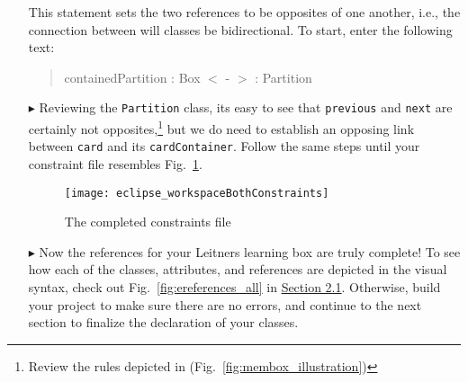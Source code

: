\begin{itemize}
This statement sets the two references to be opposites of one another, i.e., the connection between will classes be bidirectional. To start, enter the following
text:

{\begin{quote} \small
	containedPartition : Box $<$ - $>$ : Partition
\end{quote}}

\item[$\blacktriangleright$] Reviewing the \texttt{Partition} class, its easy to see that \texttt{previous} and \texttt{next} are certainly not
opposites,\footnote{Review the rules depicted in (Fig.~\ref{fig:membox_illustration})} but we do need to establish an opposing link between
\texttt{card} and its \texttt{cardContainer}. Follow the same steps until your constraint file resembles Fig.~\ref{fig:bothConstraints}.

\begin{figure}[htbp]
	\centering
  \texttt{[image: eclipse\_workspaceBothConstraints]}
	\caption{The completed constraints file}
	\label{fig:bothConstraints}
\end{figure} 

\item[$\blacktriangleright$] Now the references for your Leitners learning box are truly complete! To see how each of the classes, attributes, and references
are depicted in the visual syntax, check out Fig.~\ref{fig:ereferences_all} in \hyperlink{sec:static vis}{Section 2.1}. Otherwise, build your project to
make sure there are no errors, and continue to the next section to finalize the declaration of your classes.


\end{itemize}
